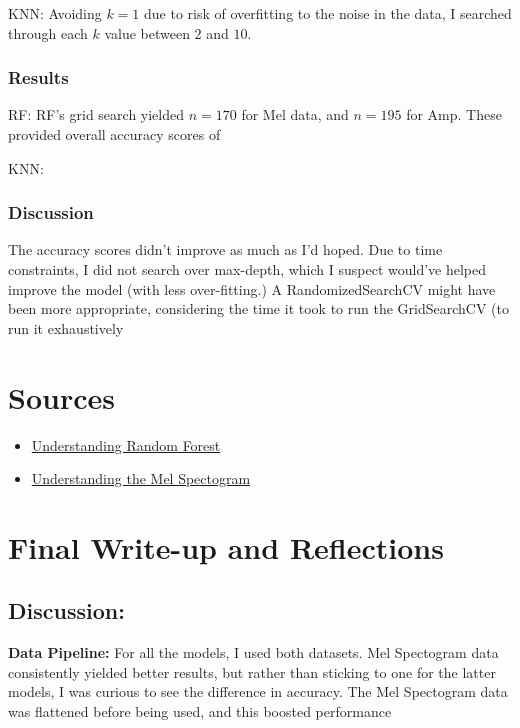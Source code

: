 \documentclass[11pt]{article}
\begin{document}
\noindent KNN: Avoiding $k=1$ due to risk of overfitting to the noise in the data, I searched through each $k$ value between $2$ and $10$.

\subsubsection{Results}
\noindent RF: RF's grid search yielded $n = 170$ for Mel data, and $n = 195$ for Amp. These provided overall accuracy scores of 

\noindent KNN: 

\subsubsection{Discussion}

The accuracy scores didn't improve as much as I'd hoped. Due to time constraints, I did not search over max-depth, which I suspect would've helped improve the model (with less over-fitting.) A RandomizedSearchCV might have been more appropriate, considering the time it took to run the GridSearchCV (to run it exhaustively 


\section{Sources}

\begin{itemize}
    \item \href{https://towardsdatascience.com/understanding-random-forest-58381e0602d2}{Understanding Random Forest}
    \item \href{https://medium.com/analytics-vidhya/understanding-the-mel-spectrogram-fca2afa2ce53}{Understanding the Mel Spectogram}
\end{itemize}


\section{Final Write-up and Reflections}

\subsection{Discussion:} 

\noindent \textbf{Data Pipeline:} For all the models, I used both datasets. Mel Spectogram data consistently yielded better results, but rather than sticking to one for the latter models, I was curious to see the difference in accuracy. The Mel Spectogram data was flattened before being used, and this boosted performance \\
\end{document}
